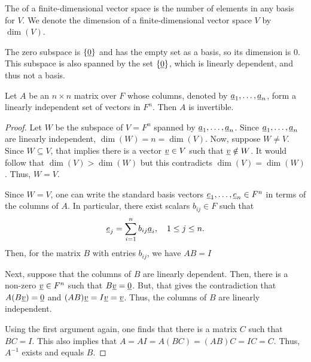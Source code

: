 \begin{definition}
The  of a finite-dimensional vector space is the number of elements in any basis for $V$.
We denote the dimension of a finite-dimensional vector space $V$ by $\dim(V)$.
\end{definition}

The zero subspace is $\{\underline{0}\}$ and has the empty set as a basis, so its dimension is $0$.
This subspace is also spanned by the set $\left\{ \underline{0} \right\}$, which is linearly dependent, and thus not a basis.

\begin{theorem}
Let $A$ be an $n \times n$ matrix over $F$ whose columns, denoted by $\underline{a}_1, \ldots, \underline{a}_n$, form a linearly independent set of vectors in $F^{n}$.
Then $A$ is invertible.
\end{theorem}
\begin{proof}
Let $W$ be the subspace of $V=F^n$ spanned by $\underline{a}_1, \ldots, \underline{a}_n$.
Since $\underline{a}_1, \ldots, \underline{a}_n$ are linearly independent, $\dim(W) = n = \dim(V)$.
Now, suppose $W \neq V$.
Since $W \subseteq V$, that implies there is a vector $\underline{v} \in V$ such that $\underline{v} \notin W$.
It would follow that $\dim(V) > \dim(W)$ but this contradicts $\dim(V) = \dim(W)$.
Thus, $W=V$.

Since $W = V$, one can write the standard basis vectors  $\underline{e}_1,\ldots,\underline{e}_n \in F^n$ in terms of the columns of $A$.
In particular, there exist scalars $b_{ij} \in F$ such that
\begin{equation*}
\underline{e}_j = \sum_{i=1}^n b_{ij} \underline{a}_i, \quad 1 \leq j \leq n.
\end{equation*}
Then, for the matrix $B$ with entries $b_{ij}$, we have $AB = I$

Next, suppose that the columns of $B$ are linearly dependent.
Then, there is a non-zero $\underline{v} \in F^n$ such that $B\underline{v} = \underline{0}$.
But, that gives the contradiction that $A(B\underline{v}) = \underline{0}$ and $(AB)\underline{v} = I \underline{v} = \underline{v}$.
Thus, the columns of $B$ are linearly independent.

Using the first argument again, one finds that there is a matrix $C$ such that $BC = I$.
This also implies that $A = AI = A(BC) = (AB)C = IC = C$.
Thus, $A^{-1}$ exists and equals $B$.
\end{proof}


